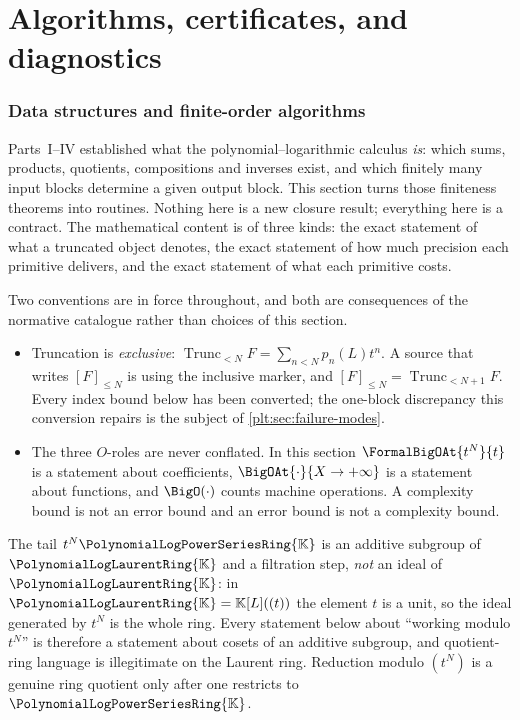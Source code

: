\documentclass[11pt,oneside]{article}
\theoremstyle{plain}
\theoremstyle{definition}
\theoremstyle{remark}
\newcommand{\K}{\mathbb{K}}
\newcommand{\PLpow}{\PolynomialLogPowerSeriesRing{\K}}   %
\newcommand{\PLlau}{\PolynomialLogLaurentRing{\K}}       %
\newcommand{\Trunc}[2]{\operatorname{Trunc}_{<#2}#1}     %
\begin{document}
\clearpage
\part{Algorithms, certificates, and diagnostics}

\section{Data structures and finite-order algorithms}
\label{plt:sec:algorithms}

Parts~I--IV established what the polynomial--logarithmic calculus \emph{is}:
which sums, products, quotients, compositions and inverses exist, and which
finitely many input blocks determine a given output block.  This section turns
those finiteness theorems into routines.  Nothing here is a new closure result;
everything here is a contract.  The mathematical content is of three kinds:
the exact statement of what a truncated object denotes, the exact statement of
how much precision each primitive delivers, and the exact statement of what
each primitive costs.

Two conventions are in force throughout, and both are consequences of the
normative catalogue rather than choices of this section.

\begin{itemize}
\item Truncation is \emph{exclusive}: \(\Trunc{F}{N}=\sum_{n<N}p_n(L)t^n\).
      A source that writes \([F]_{\le N}\) is using the inclusive marker, and
      \([F]_{\le N}=\Trunc{F}{N+1}\).  Every index bound below has been
      converted; the one-block discrepancy this conversion repairs is the
      subject of \cref{plt:sec:failure-modes}.
\item The three \(O\)-roles are never conflated.  In this section
      \(\FormalBigOAt{t^N}{t}\) is a statement about coefficients,
      \(\BigOAt{\cdot}{X\to+\infty}\) is a statement about functions, and
      \(\BigO(\cdot)\) counts machine operations.  A complexity bound is not an
      error bound and an error bound is not a complexity bound.
\end{itemize}

\begin{warningbox}
The tail \(t^N\PLpow\) is an additive subgroup of \(\PLlau\) and a filtration
step, \emph{not} an ideal of \(\PLlau\): in \(\PLlau=\K[L]((t))\) the element
\(t\) is a unit, so the ideal generated by \(t^N\) is the whole ring.  Every
statement below about ``working modulo \(t^N\)'' is therefore a statement about
cosets of an additive subgroup, and quotient-ring language is illegitimate on
the Laurent ring.  Reduction modulo \((t^N)\) is a genuine ring quotient only
after one restricts to \(\PLpow\).
\end{warningbox}
\end{document}
